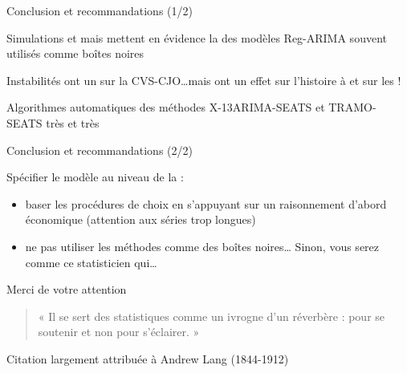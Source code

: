 \documentclass[10pt,xcolor=table,color={dvipsnames,usenames},ignorenonframetext,usepdftitle=false,french]{beamer}
\begin{document}
\begin{frame}{Conclusion et recommandations (1/2)}

\medskip

\bcinfo Simulations  et
 mais mettent en évidence la
 des modèles Reg-ARIMA
souvent utilisés comme boîtes noires

\medskip  \pause
\bcsmbh Instabilités ont un  sur la
CVS-CJO\dots \bcsmmh mais ont un effet sur l'histoire à
 et sur les
 !

\medskip  \pause
\bcattention Algorithmes automatiques des méthodes X-13ARIMA-SEATS et
TRAMO-SEATS très  et très

\end{frame}

\begin{frame}{Conclusion et recommandations (2/2)}

Spécifier le modèle  au niveau de la
 :

\begin{itemize}
\item
  baser les procédures de choix en s'appuyant sur un raisonnement
  d'abord économique (attention aux séries trop longues)
\item
  \bcinterdit ne pas utiliser les méthodes comme des boîtes
  noires\ldots{} \pause Sinon, vous serez comme ce statisticien
  qui\ldots{}
\end{itemize}

\end{frame}

\begin{frame}{Merci de votre attention}

\begin{quote}
« Il se sert des statistiques comme un ivrogne d'un réverbère : pour se soutenir et non pour s'éclairer. »
\end{quote}

Citation largement attribuée à Andrew Lang (1844-1912)

\addtocounter{framenumber}{-1}

\end{frame}
\end{document}
